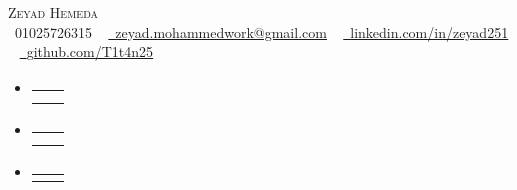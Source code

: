 \documentclass[letterpaper,11pt]{article}
\makeatletter
\newcommand{\resumeSubheading}[4]{
  \vspace{-2pt}\item
    \begin{tabular*}{1.0\textwidth}[t]{l@{\extracolsep{\fill}}r}
      \textbf{#1} & \textbf{\small #2} \\
      \textit{\small#3} & \textit{\small #4} \\
    \end{tabular*}\vspace{-7pt}
}
\newcommand{\resumeEduSubheading}[4]{
  \vspace{-2pt}\item
    \begin{tabular*}{1.0\textwidth}[t]{l@{\extracolsep{\fill}}r}
      \textbf{#1} & \textbf{\small #2} \\
      \textit{\small#3} & \textit{\small #4} \\
    \end{tabular*}\vspace{-7pt}
}
\newcommand{\resumeProjectHeading}[2]{
    \item
    \begin{tabular*}{1.001\textwidth}{l@{\extracolsep{\fill}}r}
      \small#1 & \textbf{\small #2}\\
    \end{tabular*}\vspace{-7pt}
}
\newcommand{\resumeSubHeadingListStart}{\begin{itemize}[leftmargin=0.0in, label={}]}
\newcommand{\resumeSubHeadingListEnd}{\end{itemize}}
\newcommand{\summaryPlaceholder}[1]{#1}
\newcommand{\sectionPlaceholder}[1]{#1}
\newcommand{\eduPlaceholder}[1]{#1}
\newcommand{\projectsPlaceholder}[1]{#1}
\newcommand{\expPlaceholder}[1]{#1}
\newcommand{\infoPlaceholder}[1]{#1}
\newcommand{\techSkillsPlaceholder}[1]{#1}
\newcommand{\softSkillsPlaceholder}[1]{#1}
\makeatother
\begin{document}
\begin{center}
  \infoPlaceholder{
    {\Huge \scshape Zeyad Hemeda} \\ \vspace{1pt}
    \small \raisebox{-0.1\height}\faPhone\ 01025726315 ~ \href{mailto:zeyad.mohammedwork@gmail.com}{\raisebox{-0.2\height}\faEnvelope\  \underline{zeyad.mohammedwork@gmail.com}} ~ 
    \href{https://linkedin.com/in/zeyad251}{\raisebox{-0.2\height}\faLinkedin\ \underline{linkedin.com/in/zeyad251}}  ~
    \href{https://github.com/T1t4n25}{\raisebox{-0.2\height}\faGithub\ \underline{github.com/T1t4n25}}
  }
    \vspace{-8pt}
\end{center}

\sectionPlaceholder{}
  \resumeSubHeadingListStart
  \eduPlaceholder{
    \resumeEduSubheading
    { }{}
    {}{}
  }
  \resumeSubHeadingListEnd


\sectionPlaceholder{}
\small{
  \summaryPlaceholder{}
}
\vspace{-10pt}

\sectionPlaceholder{}

  \resumeSubHeadingListStart
    \expPlaceholder{
    \resumeSubheading
      {}{}
      {}{}
      
}
  \resumeSubHeadingListEnd
  \vspace{-16pt}

\sectionPlaceholder{}
\vspace{-5pt}
\resumeSubHeadingListStart

\projectsPlaceholder{

  \resumeProjectHeading
    {\textbf{}  \emph{}}{}
    
    

  
  \vspace{-13pt}
  }
\resumeSubHeadingListEnd

\vspace{-2pt}
\sectionPlaceholder{}
 \begin{itemize}[leftmargin=0.15in, label={}]

    \small{\item{
    \techSkillsPlaceholder{
     \textbf{}{} \\

    }
    }
    }
 \end{itemize}
 \vspace{-16pt}

 \sectionPlaceholder{}
    \begin{itemize}[leftmargin=0.15in, label={}]
      \small{\item{
      \softSkillsPlaceholder{
        \emph{}
      }
        }}
    \end{itemize}
    \vspace{-10pt}
\end{document}
